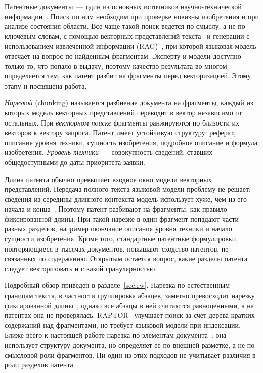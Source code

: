 \documentclass{article}
\begin{document}
Патентные документы~--- один из основных источников научно-технической информации~\citep{jiang2025patentsurvey}. Поиск по ним необходим при проверке новизны изобретения и при анализе состояния области. Все чаще такой поиск ведется по смыслу, а не по ключевым словам, с помощью векторных представлений текста~\citep{reimers2019sbert,karpukhin2020dpr} и генерации с использованием извлеченной информации (RAG)~\citep{lewis2020rag}, при которой языковая модель отвечает на вопрос по найденным фрагментам. Эксперту и модели доступно только то, что попало в выдачу, поэтому качество результата во многом определяется тем, как патент разбит на фрагменты перед векторизацией. Этому этапу и посвящена работа.

\emph{Нарезкой} (chunking) называется разбиение документа на фрагменты, каждый из которых модель векторных представлений переводит в вектор независимо от остальных. При \emph{векторном поиске} фрагменты ранжируются по близости их векторов к вектору запроса. Патент имеет устойчивую структуру: реферат, описание уровня техники, сущность изобретения, подробное описание и формула изобретения. \emph{Уровень техники}~--- совокупность сведений, ставших общедоступными до даты приоритета заявки.

Длина патента обычно превышает входное окно модели векторных представлений. Передача полного текста языковой модели проблему не решает: сведения из середины длинного контекста модель использует хуже, чем из его начала и конца~\citep{liu2024lost}. Поэтому патент разбивают на фрагменты, как правило фиксированной длины. При такой нарезке в один фрагмент попадают части разных разделов, например окончание описания уровня техники и начало сущности изобретения. Кроме того, стандартные патентные формулировки, повторяющиеся в тысячах документов, повышают сходство патентов, не связанных по содержанию. Открытым остается вопрос, какие разделы патента следует векторизовать и с какой гранулярностью.

Подробный обзор приведен в разделе~\ref{sec:rw}. Нарезка по естественным границам текста, в частности группировка абзацев, заметно превосходит нарезку фиксированной длины~\citep{shaukat2026chunking}, однако все абзацы в ней считаются равноценными, а на патентах она не проверялась. RAPTOR~\citep{sarthi2024raptor} улучшает поиск за счет дерева кратких содержаний над фрагментами, но требует языковой модели при индексации. Ближе всего к настоящей работе нарезка по элементам документа~\citep{jimenoyepes2024financial}: она использует структуру документа, но определяет ее по внешней разметке, а не по смысловой роли фрагментов. Ни один из этих подходов не учитывает различия в роли разделов патента.
\end{document}
